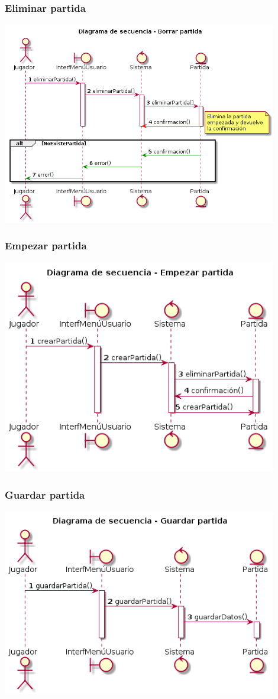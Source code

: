 \subsubsection{Eliminar partida}
  \includegraphics[width=0.9\textwidth]{./imatges/jugador/Eliminar_partida.png}
\subsubsection{Empezar partida}
  \includegraphics[width=0.9\textwidth]{./imatges/jugador/Empezar_partida.png}
\subsubsection{Guardar partida}
  \includegraphics[width=0.9\textwidth]{./imatges/jugador/Guardar_partida.png}
